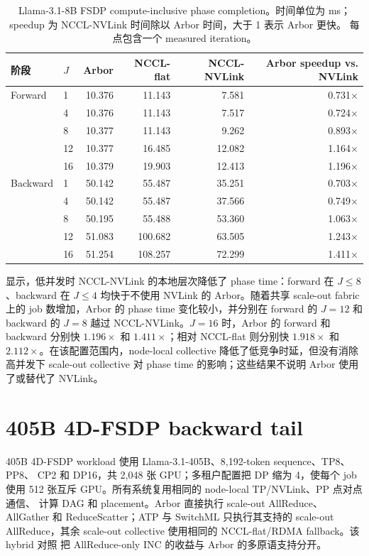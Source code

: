 \begin{table}[t]
\centering
\small
\caption{Llama-3.1-8B FSDP compute-inclusive phase completion。时间单位为
ms；speedup 为 NCCL-NVLink 时间除以 Arbor 时间，大于 1 表示 Arbor 更快。
每点包含一个 measured iteration。}
\label{tab:llm-fsdp-phase}
\begin{tabular}{llrrrr}
\toprule
阶段 & $J$ & Arbor & NCCL-flat & NCCL-NVLink &
Arbor speedup vs. NVLink \\
\midrule
Forward  & 1  & 10.376 & 11.143 &  7.581 & 0.731$\times$ \\
         & 4  & 10.376 & 11.143 &  7.517 & 0.724$\times$ \\
         & 8  & 10.377 & 11.143 &  9.262 & 0.893$\times$ \\
         & 12 & 10.377 & 16.485 & 12.082 & 1.164$\times$ \\
         & 16 & 10.379 & 19.903 & 12.413 & 1.196$\times$ \\
\midrule
Backward & 1  & 50.142 &  55.487 & 35.251 & 0.703$\times$ \\
         & 4  & 50.142 &  55.487 & 37.566 & 0.749$\times$ \\
         & 8  & 50.195 &  55.488 & 53.360 & 1.063$\times$ \\
         & 12 & 51.083 & 100.682 & 63.505 & 1.243$\times$ \\
         & 16 & 51.254 & 108.257 & 72.299 & 1.411$\times$ \\
\bottomrule
\end{tabular}
\end{table}

 显示，低并发时 NCCL-NVLink 的本地层次降低了
phase time：forward 在 $J\leq8$、backward 在 $J\leq4$ 均快于不使用
NVLink 的 Arbor。随着共享 scale-out fabric 上的 job 数增加，Arbor 的
phase time 变化较小，并分别在 forward 的 $J=12$ 和 backward 的 $J=8$
越过 NCCL-NVLink。$J=16$ 时，Arbor 的 forward 和 backward 分别快
$1.196\times$ 和 $1.411\times$；相对 NCCL-flat 则分别快
$1.918\times$ 和 $2.112\times$。在该配置范围内，node-local collective
降低了低竞争时延，但没有消除高并发下 scale-out collective 对 phase time
的影响；这些结果不说明 Arbor 使用了或替代了 NVLink。

\section{405B 4D-FSDP backward tail}
\label{ssec:llm-405b-fourd-fsdp}

405B 4D-FSDP workload 使用 Llama-3.1-405B、8,192-token sequence、TP8、PP8、
CP2 和 DP16，共 2,048 张 GPU；多租户配置把 DP 缩为 4，使每个 job 使用
512 张互斥 GPU。所有系统复用相同的 node-local TP/NVLink、PP 点对点通信、
计算 DAG 和 placement。Arbor 直接执行 scale-out AllReduce、AllGather 和
ReduceScatter；ATP 与 SwitchML 只执行其支持的 scale-out AllReduce，其余
scale-out collective 使用相同的 NCCL-flat/RDMA fallback。该 hybrid 对照
把 AllReduce-only INC 的收益与 Arbor 的多原语支持分开。

